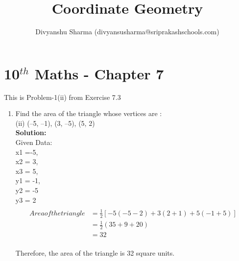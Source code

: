 \documentclass[12pt]{article}
\title{Coordinate Geometry}
\author{Divyanshu Sharma (divyansusharma@sriprakashschools.com)}
\newcommand{\solution}{\noindent \textbf{Solution: }}
\begin{document}
\maketitle
\section*{10$^{th}$ Maths - Chapter 7}
This is Problem-1(ii) from Exercise 7.3
\begin{enumerate}
\item Find the area of the triangle whose vertices are : 
\\ (ii) (–5, –1), (3, –5), (5, 2)
\\\solution \\ 
Given Data: 
\\x1 =-5, 
\\x2 = 3, 
\\x3 = 5, 
\\y1 = -1, 
\\y2 = -5 
\\y3 = 2
\begin{align}
\\Area of the triangle &=\frac{1}{2} [-5 { (-5-2)} + 3(2+1) + 5{(-1+5)}]
\\ &=\frac{1}{2}{(35 + 9 + 20)} \\ &= 32
\end{align}
\\Therefore, the area of the triangle is 32 square units.


\end{enumerate}
\end{document}
